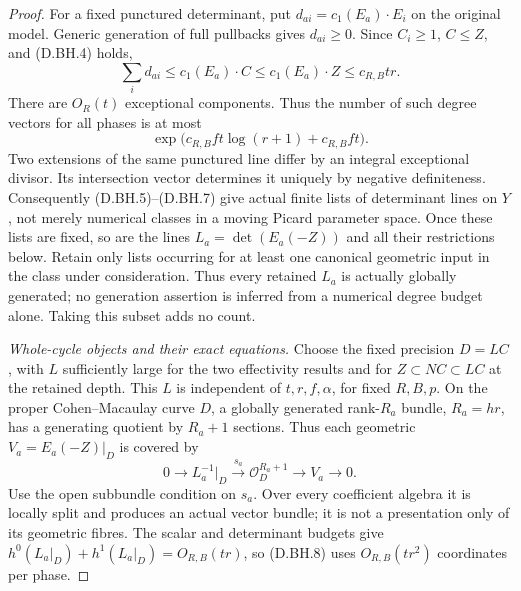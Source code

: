 \begin{proof}
For a fixed punctured determinant, put
$d_{ai}=c_1(E_a)\cdot E_i$ on the original model.
Generic generation of full pullbacks gives $d_{ai}\ge0$.
Since $C_i\ge1$, $C\le Z$, and (D.BH.4) holds,
\[
             \sum_i d_{ai}\le c_1(E_a)\cdot C
                            \le c_1(E_a)\cdot Z
                            \le c_{R,B}tr.             \tag{D.BH.6}
\]
There are $O_R(t)$ exceptional components. Thus the
number of such degree vectors for all phases is at most
\[
       \exp\bigl(c_{R,B}ft\log(r+1)+c_{R,B}ft\bigr).
                                                        \tag{D.BH.7}
\]
Two extensions of the same punctured line differ by
an integral exceptional divisor. Its intersection
vector determines it uniquely by negative definiteness.
Consequently (D.BH.5)--(D.BH.7) give actual finite lists
of determinant lines on $Y$, not merely numerical
classes in a moving Picard parameter space. Once these
lists are fixed, so are the lines
$L_a=\det(E_a(-Z))$ and all their restrictions below.
Retain only lists occurring for at least one canonical
geometric input in the class under consideration. Thus
every retained $L_a$ is actually globally generated;
no generation assertion is inferred from a numerical
degree budget alone. Taking this subset adds no count.

\emph{Whole-cycle objects and their exact equations.}
Choose the fixed precision $D=LC$, with $L$ sufficiently
large for the two effectivity results and for
$Z\subset NC\subset LC$ at the retained depth. This
$L$ is independent of $t,r,f,\alpha$, for fixed $R,B,p$.
On the proper Cohen--Macaulay curve $D$, a globally
generated rank-$R_a$ bundle, $R_a=hr$, has a generating
quotient by $R_a+1$ sections. Thus each geometric
$V_a=E_a(-Z)|_D$ is covered by
\[
       0\longrightarrow L_a^{-1}|_D
       \xrightarrow{s_a}\mathcal O_D^{R_a+1}
       \longrightarrow V_a\longrightarrow0.          \tag{D.BH.8}
\]
Use the open subbundle condition on $s_a$.
Over every coefficient algebra it is locally split
and produces an actual vector bundle; it is not a
presentation only of its geometric fibres.
The scalar and determinant budgets give
$h^0(L_a|_D)+h^1(L_a|_D)=O_{R,B}(tr)$, so (D.BH.8)
uses $O_{R,B}(tr^2)$ coordinates per phase.


\end{proof}
